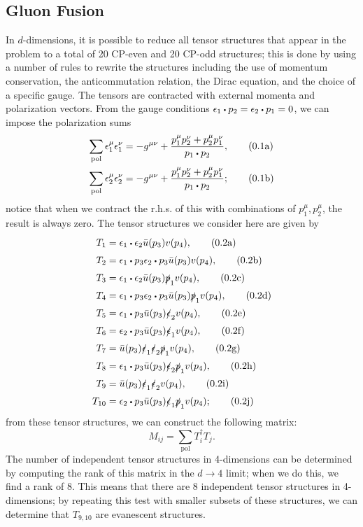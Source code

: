 \documentclass[12pt]{article}
\numberwithin{equation}{section}
\numberwithin{figure}{section}
\numberwithin{table}{section}
\newcommand{\numberthisa}{\addtocounter{equation}{1}\tag{\theequation a}}
\newcommand{\numberthisb}{\addtocounter{equation}{0}\tag{\theequation b}}
\newcommand{\numberthisc}{\addtocounter{equation}{0}\tag{\theequation c}}
\newcommand{\numberthisd}{\addtocounter{equation}{0}\tag{\theequation d}}
\newcommand{\numberthise}{\addtocounter{equation}{0}\tag{\theequation e}}
\newcommand{\numberthisf}{\addtocounter{equation}{0}\tag{\theequation f}}
\newcommand{\numberthisg}{\addtocounter{equation}{0}\tag{\theequation g}}
\newcommand{\numberthish}{\addtocounter{equation}{0}\tag{\theequation h}}
\newcommand{\numberthisi}{\addtocounter{equation}{0}\tag{\theequation i}}
\newcommand{\numberthisj}{\addtocounter{equation}{0}\tag{\theequation j}}
\renewcommand{\theequation}{\arabic{section}.\arabic{equation}}
\newcommand{\ndot}{\mathrel{\raisebox{-2.3pt}{$ \!  \mathlarger{\mathlarger{\mathlarger{\mathlarger{\cdot}}}} \! $}}}
\begin{document}
	\subsection{Gluon Fusion}
	
	In \(d\)-dimensions, it is possible to reduce all tensor structures that appear in the problem to a total of 20 CP-even and 20 CP-odd structures; this is done by using a number of rules to rewrite the structures including the use of momentum conservation, the anticommutation relation, the Dirac equation, and the choice of a specific gauge. The tensors are contracted with external momenta and polarization vectors. From the gauge conditions \(\epsilon_1\ndot p_2=\epsilon_2\ndot p_1=0\), we can impose the polarization sums  
	\begin{align*}
	\sum_\mathrm{pol}\epsilon_1^\mu\epsilon_1^\nu & =-g^{\mu\nu}+\frac{p_1^\mu p_2^\nu+p_2^\mu p_1^\nu}{p_1\ndot p_2}, \numberthisa\\
	\sum_\mathrm{pol}\epsilon_2^\mu\epsilon_2^\nu & =-g^{\mu\nu}+\frac{p_1^\mu p_2^\nu+p_2^\mu p_1^\nu}{p_1\ndot p_2}; \numberthisb
	\end{align*}
	notice that when we contract the r.h.s. of this with combinations of \(p_1^\mu,p_2^\mu\), the result is always zero. The tensor structures we consider here are given by  
	\begin{align*}
	T_1 & =\epsilon_1\ndot\epsilon_2\bar{u}(p_3)v(p_4), \numberthisa\\
	T_2 & =\epsilon_1\ndot p_3\epsilon_2\ndot p_3\bar{u}(p_3)v(p_4), \numberthisb\\
	T_3 & =\epsilon_1\ndot\epsilon_2\bar{u}(p_3)\slashed{p}_1v(p_4), \numberthisc\\
	T_4 & =\epsilon_1\ndot p_3\epsilon_2\ndot p_3\bar{u}(p_3)\slashed{p}_1v(p_4), \numberthisd\\
	T_5 & =\epsilon_1\ndot p_3\bar{u}(p_3)\slashed{\epsilon}_2v(p_4), \numberthise\\
	T_6 & =\epsilon_2\ndot p_3\bar{u}(p_3)\slashed{\epsilon}_1v(p_4), \numberthisf\\
	T_7 & =\bar{u}(p_3)\slashed{\epsilon}_1\slashed{\epsilon}_2\slashed{p}_1v(p_4), \numberthisg\\
	T_8 & =\epsilon_1\ndot p_3\bar{u}(p_3)\slashed{\epsilon}_2\slashed{p}_1v(p_4), \numberthish\\
	T_9 & =\bar{u}(p_3)\slashed{\epsilon}_1\slashed{\epsilon}_2v(p_4), \numberthisi\\
	T_{10} & =\epsilon_2\ndot p_3\bar{u}(p_3)\slashed{\epsilon}_1\slashed{p}_1v(p_4); \numberthisj
	\end{align*}
	from these tensor structures, we can construct the following matrix:
	\begin{equation}
	M_{ij}=\sum_\mathrm{pol}T_i^\dagger T_j.
	\end{equation}
	The number of independent tensor structures in 4-dimensions can be determined by computing the rank of this matrix in the \(d\rightarrow 4\) limit; when we do this, we find a rank of 8. This means that there are 8 independent tensor structures in 4-dimensions; by repeating this test with smaller subsets of these structures, we can determine that \(T_{9,10}\) are evanescent structures. 
	
\end{document}
